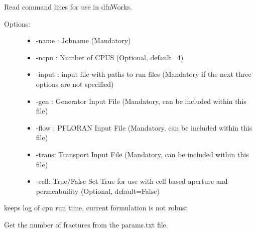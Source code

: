 \documentclass[letterpaper,10pt,english]{sphinxmanual}
\begin{document}
\begin{fulllineitems}
\label{\detokenize{pydfnworks:pydfnworks.helper.commandline_options}}
Read command lines for use in dfnWorks.
\begin{description}
\item[{Options:}] \leavevmode\begin{itemize}
\item {} 
-name : Jobname (Mandatory)

\item {} 
-ncpu : Number of CPUS (Optional, default=4)

\item {} 
-input : input file with paths to run files (Mandatory if the next three options are not specified)

\item {} 
-gen : Generator Input File (Mandatory, can be included within this file)

\item {} 
-flow : PFLORAN Input File (Mandatory, can be included within this file)

\item {} 
-trans: Transport Input File (Mandatory, can be included within this file)

\item {} 
-cell: True/False Set True for use with cell based aperture and permeabuility (Optional, default=False)

\end{itemize}

\end{description}

\end{fulllineitems}


\begin{fulllineitems}
\label{\detokenize{pydfnworks:pydfnworks.helper.dump_time}}
keeps log of cpu run time, current formulation is not robust

\end{fulllineitems}


\begin{fulllineitems}
\label{\detokenize{pydfnworks:pydfnworks.helper.get_num_frac}}
Get the number of fractures from the params.txt file.

\end{fulllineitems}
\end{document}
